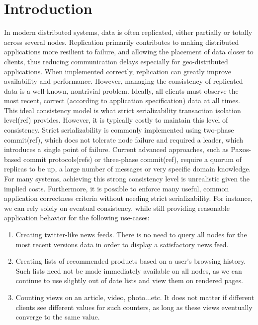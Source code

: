 

\section{Introduction}

In modern distributed systems, data is often replicated, either partially or totally 
across several nodes. Replication primarily contributes to making distributed 
applications more resilient to failure, and allowing the placement of data closer to clients, 
thus reducing communication delays especially for geo-distributed applications. 
When implemented correctly, replication can greatly improve availability and performance.
However, managing the consistency of replicated data is a well-known, nontrivial
problem. Ideally, all clients must observe the most recent, correct (according to
application specification) data at all times. This ideal consistency model is what
strict serializability transaction isolation level(ref) provides. However, it
is typically costly to maintain this level of consistency. Strict
serializability is commonly implemented using two-phase commit(ref), which does not
tolerate node failure and required a leader, which introduces a single point of
failure. Current advanced approaches, such as Paxos-based commit protocols(refs) or three-phase commit(ref),
require a quorum of replicas to be up, a large number of messages or very
specific domain knowledge. \\  %

For many systems, achieving this strong consistency level is unrealistic given
the implied costs. Furthermore, it is possible to enforce many useful, common
application correctness criteria without needing strict serializability. 
For instance, we can rely solely on eventual consistency, while still providing
reasonable application behavior for the following use-cases:

\begin{enumerate}
\item Creating twitter-like news feeds. There is no need to query all nodes for
the most recent versions data in order to display a satisfactory news feed.

\item Creating lists of recommended products based on a user's browsing history.
Such lists need not be made immediately available on all nodes, as we can
continue to use slightly out of date lists and view them on rendered pages.

\item Counting views on an article, video, photo...etc. It does not matter if
different clients see different values for such counters, as long as these
views eventually converge to the same value.
\end{enumerate}

